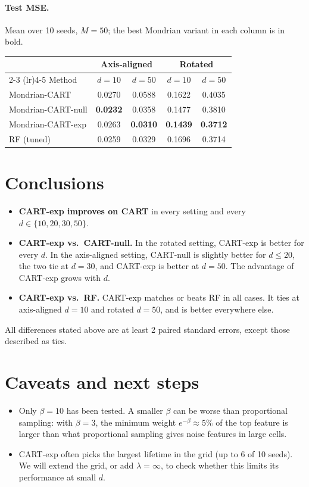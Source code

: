 \documentclass[11pt]{article}
\begin{document}
\paragraph{Test MSE.} Mean over 10 seeds, $M = 50$; the best Mondrian variant in each column is in bold.

\begin{center}
\begin{tabular}{lcccc}
\toprule
 & \multicolumn{2}{c}{Axis-aligned} & \multicolumn{2}{c}{Rotated} \\
\cmidrule(lr){2-3} \cmidrule(lr){4-5}
Method & $d=10$ & $d=50$ & $d=10$ & $d=50$ \\
\midrule
Mondrian-CART      & 0.0270          & 0.0588          & 0.1622          & 0.4035 \\
Mondrian-CART-null & \textbf{0.0232} & 0.0358          & 0.1477          & 0.3810 \\
Mondrian-CART-exp  & 0.0263          & \textbf{0.0310} & \textbf{0.1439} & \textbf{0.3712} \\
RF (tuned)         & 0.0259          & 0.0329          & 0.1696          & 0.3714 \\
\bottomrule
\end{tabular}
\end{center}

\section{Conclusions}

\begin{itemize}
  \item \textbf{CART-exp improves on CART} in every setting and every $d \in \{10, 20, 30, 50\}$.
  \item \textbf{CART-exp vs.\ CART-null.} In the rotated setting, CART-exp is better for every $d$.
    In the axis-aligned setting, CART-null is slightly better for $d \le 20$, the two tie at $d = 30$,
    and CART-exp is better at $d = 50$. The advantage of CART-exp grows with $d$.
  \item \textbf{CART-exp vs.\ RF.} CART-exp matches or beats RF in all cases. It ties at
    axis-aligned $d = 10$ and rotated $d = 50$, and is better everywhere else.
\end{itemize}
All differences stated above are at least 2 paired standard errors, except those described as ties.

\section{Caveats and next steps}

\begin{itemize}
  \item Only $\beta = 10$ has been tested. A smaller $\beta$ can be worse than proportional sampling:
    with $\beta = 3$, the minimum weight $e^{-\beta} \approx 5\%$ of the top feature is larger than
    what proportional sampling gives noise features in large cells.
  \item CART-exp often picks the largest lifetime in the grid (up to 6 of 10 seeds). We will extend
    the grid, or add $\lambda = \infty$, to check whether this limits its performance at small $d$.
\end{itemize}
\end{document}
